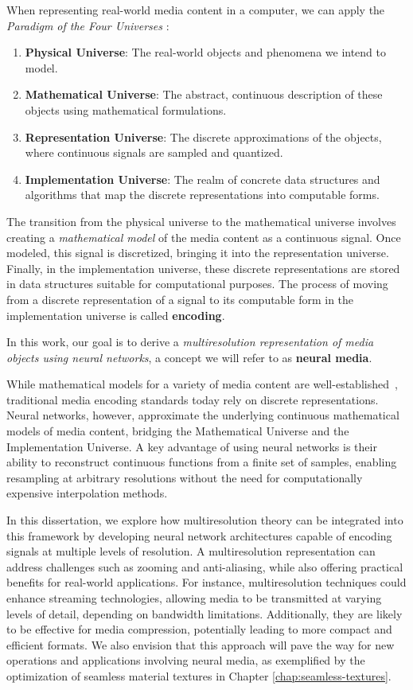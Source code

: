When representing real-world media content in a computer, we can apply the \textit{Paradigm of the Four Universes} \citep{gomes1995}:

\begin{enumerate}
\item \textbf{Physical Universe}: The real-world objects and phenomena we intend to model.
\item \textbf{Mathematical Universe}: The abstract, continuous description of these objects using mathematical formulations.
\item \textbf{Representation Universe}: The discrete approximations of the objects, where continuous signals are sampled and quantized.
\item \textbf{Implementation Universe}: The realm of concrete data structures and algorithms that map the discrete representations into computable forms.
\end{enumerate}

The transition from the physical universe to the mathematical universe involves creating a \textit{mathematical model} of the media content as a continuous signal. Once modeled, this signal is discretized, bringing it into the representation universe. Finally, in the implementation universe, these discrete representations are stored in data structures suitable for computational purposes. The process of moving from a discrete representation of a signal to its computable form in the implementation universe is called \textbf{encoding}. 


In this work, our goal is to derive a \textit{multiresolution representation of media objects using neural networks}, a concept we will refer to as \textbf{neural media}. 


While mathematical models for a variety of media content are well-established~\citep{ ipcgVelho2014, wenger2013isosurfaces}, traditional media encoding standards today rely on discrete representations. Neural networks, however, approximate the underlying continuous mathematical models of media content, bridging the Mathematical Universe and the Implementation Universe. A key advantage of using neural networks is their ability to reconstruct continuous functions from a finite set of samples, enabling resampling at arbitrary resolutions without the need for computationally expensive interpolation methods.

In this dissertation, we explore how multiresolution theory can be integrated into this framework by developing neural network architectures capable of encoding signals at multiple levels of resolution. A multiresolution representation can address challenges such as zooming and anti-aliasing, while also offering practical benefits for real-world applications. For instance, multiresolution techniques could enhance streaming technologies, allowing media to be transmitted at varying levels of detail, depending on bandwidth limitations. Additionally, they are likely to be effective for media compression, potentially leading to more compact and efficient formats. We also envision that this approach will pave the way for new operations and applications involving neural media, as exemplified by the optimization of seamless material textures in Chapter \ref{chap:seamless-textures}. 

